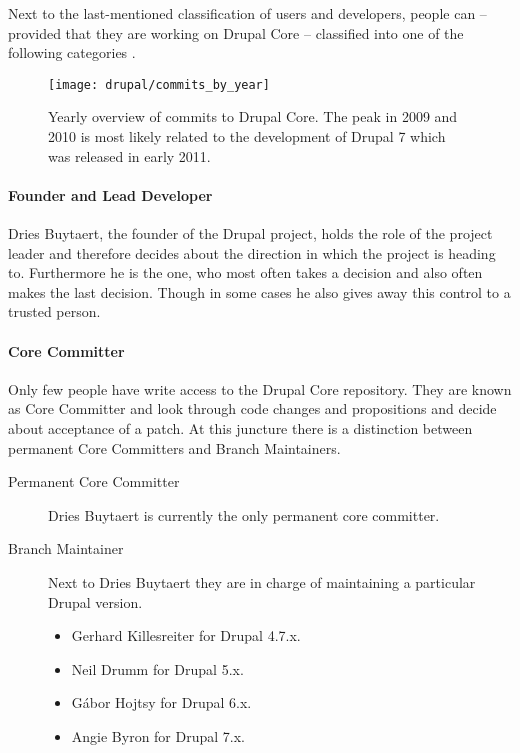 Next to the last-mentioned classification of users and developers, people can
-- provided that they are working on Drupal Core -- classified into one of the
following categories \cite{DrupalCoreDevelopers}.

\begin{figure}[htbp]
  \centering
  \texttt{[image: drupal/commits\_by\_year]}
  \caption{Yearly overview of commits to Drupal Core. The peak in 2009 and 2010
  is most likely related to the development of Drupal 7 which was released in
  early 2011.}
\end{figure}

\paragraph{Founder and Lead Developer}

Dries Buytaert, the founder of the Drupal project, holds the role of the
project leader and therefore decides about the direction in which the project
is heading to. Furthermore he is the one, who most often takes a decision and
also often makes the last decision. Though in some cases he also gives away
this control to a trusted person.

\paragraph{Core Committer}

Only few people have write access to the Drupal Core repository. They are known
as Core Committer and look through code changes and propositions and decide
about acceptance of a patch. At this juncture there is a distinction between
permanent Core Committers and Branch Maintainers.

\begin{description}
  \item[Permanent Core Committer] Dries Buytaert is currently the only permanent core
    committer.
  \item[Branch Maintainer] Next to Dries Buytaert they are in charge of
  maintaining a particular Drupal version.
  \begin{itemize}
    \item Gerhard Killesreiter for Drupal 4.7.x.
    \item Neil Drumm for Drupal 5.x.
    \item Gábor Hojtsy for Drupal 6.x.
    \item Angie Byron for Drupal 7.x.
  \end{itemize}
\end{description}

